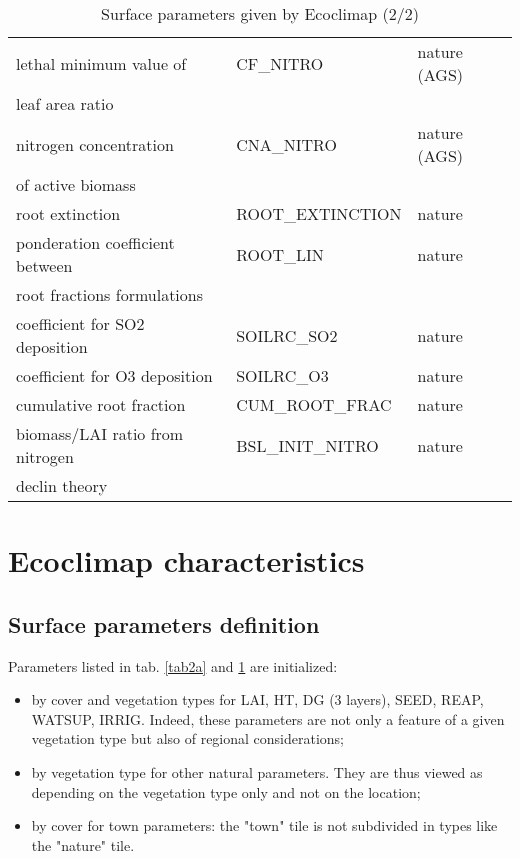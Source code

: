 \begin{table}[h]
\begin{center}
\begin{tabular}{|l|l|l| }
\hline
lethal minimum value of & CF\_NITRO & nature (AGS)\\
leaf area ratio & & \\
\hline
nitrogen concentration & CNA\_NITRO & nature (AGS)\\
of active biomass & & \\
\hline
root extinction & ROOT\_EXTINCTION & nature \\
\hline
ponderation coefficient between  & ROOT\_LIN & nature \\
root fractions formulations & & \\
\hline
coefficient for SO2 deposition & SOILRC\_SO2 & nature \\
\hline
coefficient for O3 deposition & SOILRC\_O3 & nature \\
\hline
cumulative root fraction & CUM\_ROOT\_FRAC & nature \\
\hline
biomass/LAI ratio from nitrogen & BSL\_INIT\_NITRO & nature \\
declin theory & & \\
\hline
\end{tabular}
\end{center}
\caption{Surface parameters given by Ecoclimap (2/2)}
\label{tab2b}
\end{table}

\chapter{Ecoclimap characteristics}

\section{Surface parameters definition}

Parameters listed in tab. \ref{tab2a} and \ref{tab2b} are initialized: 
\begin{itemize}
\item{by cover and vegetation types for LAI, HT, DG (3 layers), SEED, REAP, WATSUP, IRRIG. Indeed, these parameters are not only a feature of 
a given vegetation type but also of regional considerations;}
\item{by vegetation type for other natural parameters. They are thus viewed as depending on the vegetation type only and not on the location; }
\item{by cover for town parameters: the "town" tile is not subdivided in types like the "nature" tile. }
\end{itemize}


